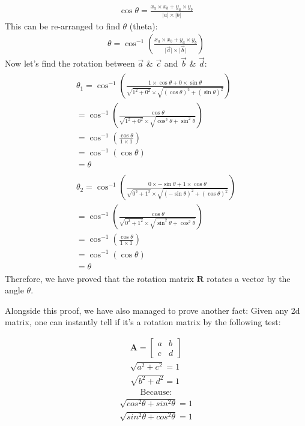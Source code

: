\documentclass{article}
\begin{document}
\begin{gather*} 
\cos \theta = \frac{x_a \times x_b+y_a \times y_b}{\left \lvert a \right \rvert \times \left \lvert b \right \rvert}
\end{gather*} 
This can be re-arranged to find $\theta$ (theta):
\begin{gather*} 
\theta = \cos^{-1}\left (  \frac{x_a \times x_b+y_a \times y_b}{\lvert \vec{a} \rvert \times \lvert \vec{b}  \rvert} \right )\label{eq:dotproduct}
\end{gather*} 
Now let's find the rotation between $\vec{a}$ \& $\vec{c}$ and $\vec{b}$ \& $\vec{d}$:
\begin{gather}
\begin{split}
\theta_1 = \cos^{-1}\left (  \frac{1 \times \cos \theta + 0 \times \sin \theta}{\sqrt{1^2 + 0^2} \times \sqrt{(\cos \theta)^2 + (\sin \theta)^2}} \right ) \\
=  \cos^{-1}\left ( \frac{\cos \theta}{\sqrt{1^2 + 0^2} \times \sqrt{\cos^2 \theta + \sin^2 \theta}}   \right ) \\
=  \cos^{-1}\left ( \frac{\cos \theta}{1 \times 1}   \right ) \\
=  \cos^{-1}\left ( \cos \theta  \right ) \\
= \theta
\end{split} \\
\begin{split}
\theta_2 = \cos^{-1}\left (  \frac{0 \times -\sin \theta + 1 \times \cos \theta}{\sqrt{0^2 + 1^2} \times \sqrt{(-\sin \theta)^2 + (\cos \theta)^2}} \right ) \\
= \cos^{-1}\left ( \frac{\cos \theta}{\sqrt{0^2 + 1^2} \times \sqrt{\sin^2 \theta + \cos^2 \theta}}   \right ) \\
=  \cos^{-1}\left ( \frac{\cos \theta}{1 \times 1}   \right ) \\
=  \cos^{-1}\left ( \cos \theta  \right ) \\
= \theta
\end{split}
\end{gather}
Therefore, we have proved that the rotation matrix $\boldsymbol{R}$ rotates a vector by the angle $\theta$.

\begin{minipage}{\textwidth}
Alongside this proof, we have also managed to prove another fact:
Given any 2d matrix, one can instantly tell if it's a rotation matrix by the following test:

\begin{gather}
\boldsymbol{A} =  \begin{bmatrix}a & b \\ c & d \end{bmatrix} \\
\sqrt{a^2+c^2} = 1 \\
\sqrt{b^2+d^2} = 1 
\end{gather}
\begin{gather*}
\text{Because:}
\end{gather*}
\begin{gather}
\sqrt{cos^2 \theta+sin^2 \theta} = 1 \\
\sqrt{sin^2 \theta + cos^2 \theta} = 1 
\end{gather}
\end{minipage}	
\end{document}
